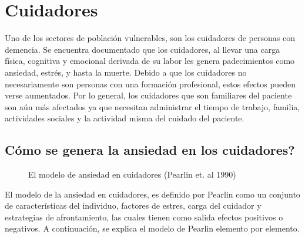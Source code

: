 \section{Cuidadores}\label{secc:caregivers}
Uno de los sectores de poblaci\'on vulnerables, son los cuidadores de personas con demencia. Se encuentra documentado que los cuidadores, al llevar una carga f\'isica, cognitiva y emocional derivada de su labor les genera padecimientos como ansiedad, estr\'es, y hasta la muerte\citep{Chen2013}. Debido a que los cuidadores no necesariamente son personas con una formaci\'on profesional, estos efectos pueden verse aumentados. Por lo general, los cuidadores que son familiares del paciente son a\'un m\'as afectados ya que necesitan administrar el tiempo de trabajo, familia, actividades sociales y la actividad misma del cuidado del paciente.

\subsection{C\'omo se genera la ansiedad en los cuidadores?}\label{secc:caregiverburden}

\begin{figure}[h]
	\centering
	\caption{El modelo de ansiedad en cuidadores (Pearlin et. al 1990)} \label{fig:modeloAnsiedad}
\end{figure}
El modelo de la ansiedad en cuidadores, es definido por Pearlin como un conjunto de caracter\'isticas del individuo, factores de estres, carga del cuidador y estrategias de afrontamiento, las cuales tienen como salida efectos positivos o negativos\citep{Pearlin01101990}. A continuaci\'on, se explica el modelo de Pearlin elemento por elemento.
